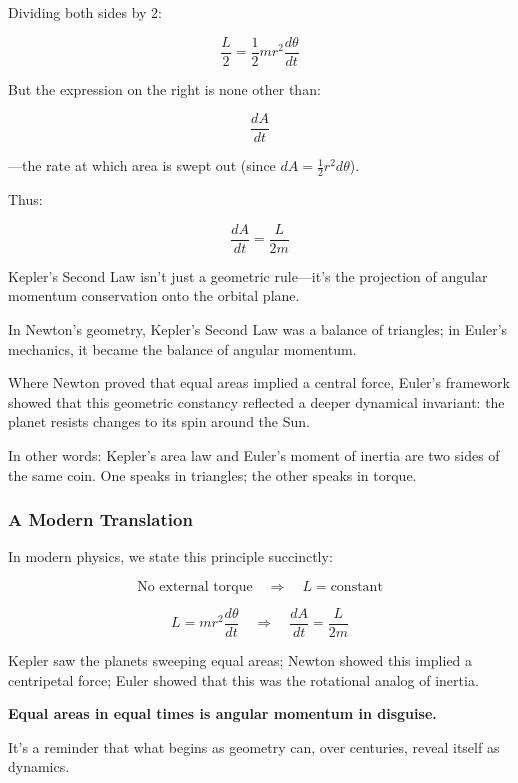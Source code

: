 Dividing both sides by 2:

\[
\frac{L}{2} = \frac{1}{2} m r^2 \frac{d\theta}{dt}
\]

But the expression on the right is none other than:

\[
\frac{dA}{dt}
\]

—the rate at which area is swept out (since \( dA = \frac{1}{2} r^2 d\theta \)).

Thus:

\[
\frac{dA}{dt} = \frac{L}{2m}
\]

Kepler’s Second Law isn’t just a geometric rule—it’s the projection of angular momentum conservation onto the orbital plane.

\begin{tcolorbox}[colback=gray!5!white, colframe=black, title=\textbf{Historical Sidebar: From Area to Angular Momentum}, fonttitle=\bfseries, arc=1.5mm, boxrule=0.4pt]

In Newton’s geometry, Kepler’s Second Law was a balance of triangles; in Euler’s mechanics, it became the balance of angular momentum.

Where Newton proved that equal areas implied a central force, Euler’s framework showed that this geometric constancy reflected a deeper dynamical invariant: the planet resists changes to its spin around the Sun.

\medskip

In other words: Kepler’s area law and Euler’s moment of inertia are two sides of the same coin. One speaks in triangles; the other speaks in torque.

\end{tcolorbox}

\subsubsection{A Modern Translation}

In modern physics, we state this principle succinctly:

\[
\text{No external torque} \quad \Rightarrow \quad L = \text{constant}
\]

\[
L = m r^2 \frac{d\theta}{dt}
\quad \Rightarrow \quad
\frac{dA}{dt} = \frac{L}{2m}
\]

Kepler saw the planets sweeping equal areas; Newton showed this implied a centripetal force; Euler showed that this was the rotational analog of inertia.

\textbf{Equal areas in equal times is angular momentum in disguise.}

It’s a reminder that what begins as geometry can, over centuries, reveal itself as dynamics.

